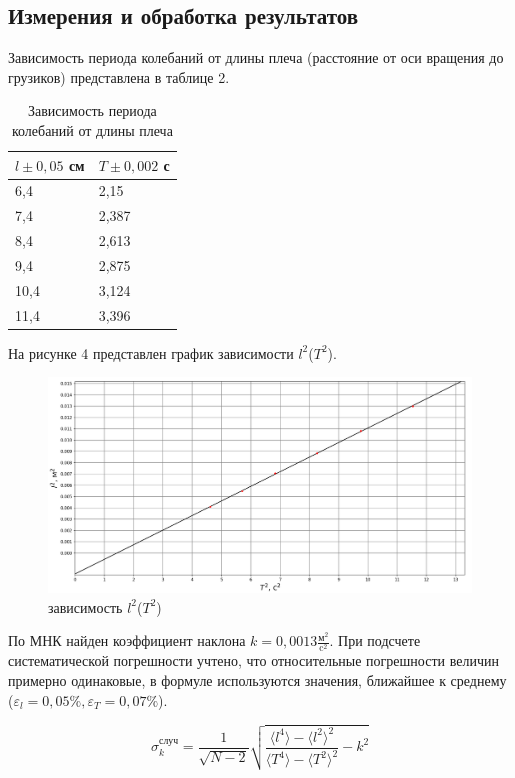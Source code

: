 \documentclass[a4paper, 12pt]{article}
\begin{document}
\subsection{Измерения и обработка результатов}
Зависимость периода колебаний от длины плеча (расстояние от оси вращения до грузиков) представлена в таблице 2.
\begin{table}[!ht]
    \centering
    \begin{tabular}{|l|l|}
    \hline
        $l \pm 0,05$ см & $T\pm 0,002$ с \\ \hline
        6,4 & 2,15 \\ \hline
        7,4 & 2,387 \\ \hline
        8,4 & 2,613 \\ \hline
        9,4 & 2,875 \\ \hline
        10,4 & 3,124 \\ \hline
        11,4 & 3,396 \\ \hline
    \end{tabular}
    \caption{Зависимость периода колебаний от длины плеча}
\end{table}
На рисунке 4 представлен график зависимости $l^2$($T^2$).
\begin{figure}[h]
    \centering
    \includegraphics[scale = 0.5]{plotb.png}
    \caption{зависимость $l^2$($T^2$)}
    \label{fig:enter-label}
\end{figure}
По МНК найден коэффициент наклона $k = 0,0013 \frac{\text{м}^2}{\text{c}^2}$. При подсчете систематической погрешности учтено, что относительные погрешности величин примерно одинаковые, в формуле используются значения, ближайшее к среднему ($\varepsilon_l = 0,05 \%, \varepsilon_T = 0,07 \%$).

\[ \sigma_k^{\text{случ}} = \frac{1}{\sqrt{N - 2}}\sqrt{\frac{\langle {l}^4 \rangle -\langle {l^2} \rangle^2}{
    \langle T^4 \rangle - \langle T^2 \rangle^2} - k^2}\]
\end{document}
